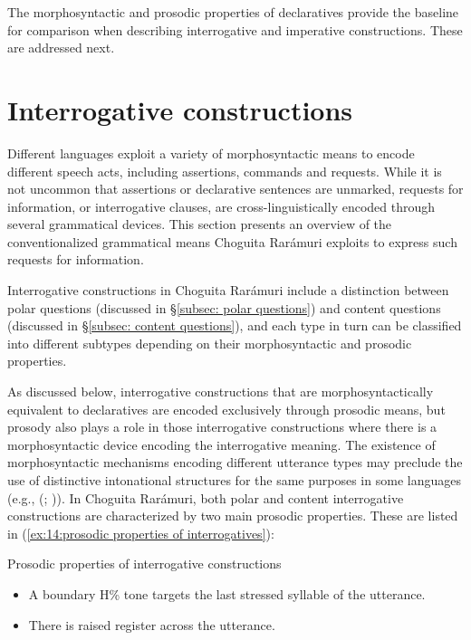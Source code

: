 The morphosyntactic and prosodic properties of declaratives provide the baseline for comparison when describing interrogative and imperative constructions. These are addressed next.

\section{Interrogative constructions}
\label{sec: interrogative constructions}

Different languages exploit a variety of morphosyntactic means to encode different speech acts, including assertions, commands and requests. While it is not uncommon that assertions or declarative sentences are unmarked, requests for information, or interrogative clauses, are cross-linguistically encoded through several grammatical devices. This section presents an overview of the conventionalized grammatical means Choguita Rarámuri exploits to express such requests for information.

\hspace*{-3pt}Interrogative constructions in Choguita Rarámuri include a distinction between polar questions (discussed in §\ref{subsec: polar questions}) and content questions (discussed in §\ref{subsec: content questions}), and each type in turn can be classified into different subtypes depending on their morphosyntactic and prosodic properties.

As discussed below, interrogative constructions that are morphosyntactically equivalent to declaratives are encoded exclusively through prosodic means, but prosody also plays a role in those interrogative constructions where there is a morphosyntactic device encoding the interrogative meaning. The existence of morphosyntactic mechanisms encoding different utterance types may preclude the use of distinctive intonational structures for the same purposes in some  languages (e.g.,  (; \citealt{mcdonough2002prosody})). In Choguita Rarámuri, both polar and content interrogative constructions are characterized by two main prosodic properties. These are listed in (\ref{ex:14:prosodic properties of interrogatives}):

\ea\label{ex:14:prosodic properties of interrogatives}
{Prosodic properties of interrogative constructions}

\begin{itemize}
    \item A boundary H\% tone targets the last stressed syllable of the utterance.\\
    \item There is raised register across the utterance.\\
\end{itemize}
\z

